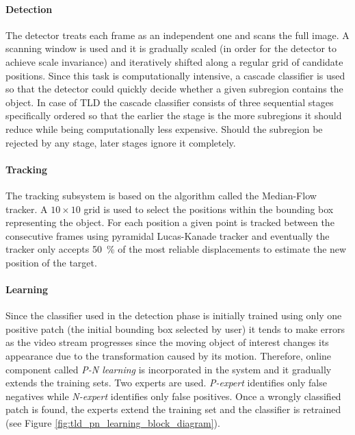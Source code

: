 \paragraph{Detection} The detector treats each frame as an independent one and scans the full image. A scanning window is used and it is gradually scaled (in order for the detector to achieve scale invariance) and iteratively shifted along a regular grid of candidate positions. Since this task is computationally intensive, a cascade classifier is used so that the detector could quickly decide whether a given subregion contains the object. In case of TLD the cascade classifier consists of three sequential stages specifically ordered so that the earlier the stage is the more subregions it should reduce while being computationally less expensive. Should the subregion be rejected by any stage, later stages ignore it completely.

\paragraph{Tracking} The tracking subsystem is based on the algorithm called the Median-Flow tracker. A $10 \times 10$ grid is used to select the positions within the bounding box representing the object. For each position a given point is tracked between the consecutive frames using pyramidal Lucas-Kanade tracker and eventually the tracker only accepts 50~\% of the most reliable displacements to estimate the new position of the target.

\paragraph{Learning} Since the classifier used in the detection phase is initially trained using only one positive patch (the initial bounding box selected by user) it tends to make errors as the video stream progresses since the moving object of interest changes its appearance due to the transformation caused by its motion. Therefore, online component called \textit{P-N learning} is incorporated in the system and it gradually extends the training sets. Two experts are used. \textit{P-expert} identifies only false negatives while \textit{N-expert} identifies only false positives. Once a wrongly classified patch is found, the experts extend the training set and the classifier is retrained (see Figure \ref{fig:tld_pn_learning_block_diagram}).

